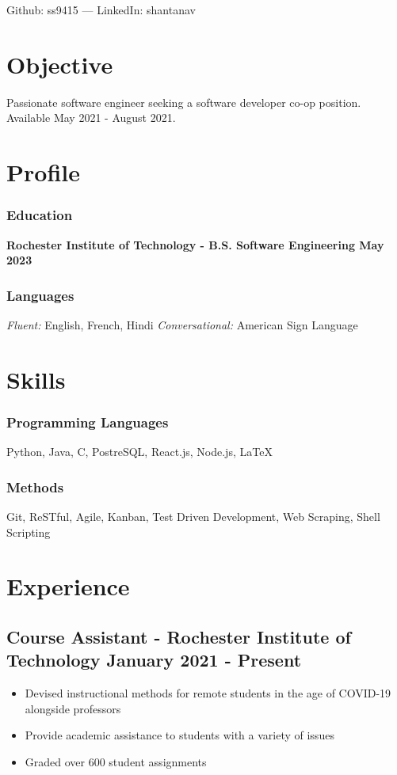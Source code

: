 \documentclass[11pt, letterpaper]{article}
\renewcommand{\maketitle} {
    \begin{center}    
        {\huge\bfseries \theauthor}

        \vspace{.5em}

        Github: ss9415 --- LinkedIn: shantanav
    \end{center}
    \thispagestyle{empty}
}
\begin{document}
    \author{Shantanav Saurav}

    \maketitle

    \section{Objective}
        Passionate software engineer seeking a software developer co-op position. 
        Available May 2021 - August 2021.

    \section{Profile}
        \subsubsection{Education}
            \textbf{Rochester Institute of Technology - B.S. Software Engineering \hfill May 2023}
        \subsubsection{Languages}
            \emph{Fluent:} English, French, Hindi 
            \emph{Conversational:} American Sign Language

    \section{Skills}
        \subsubsection{Programming Languages}
            Python, Java, C, PostreSQL, React.js, Node.js, \LaTeX
        \subsubsection{Methods}
            Git, ReSTful, Agile, Kanban, Test Driven Development, Web Scraping, Shell Scripting

    \section{Experience}
        \subsection{Course Assistant - Rochester Institute of Technology \hfill January 2021 - Present}
            \begin{itemize}[nosep]
                \item Devised instructional methods for remote students in the age of COVID-19 alongside
                professors
                \item Provide academic assistance to students with a variety of issues
                \item Graded over 600 student assignments
            \end{itemize}
\end{document}
